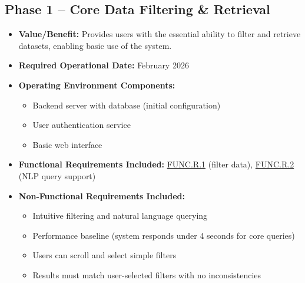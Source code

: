 \documentclass[12pt]{article}
\begin{document}
\subsection*{Phase 1 -- Core Data Filtering \& Retrieval}
\begin{itemize}
    \item \textbf{Value/Benefit:} Provides users with the essential ability to filter and retrieve datasets, enabling basic use of the system.
    \item \textbf{Required Operational Date:} February 2026
    \item \textbf{Operating Environment Components:}
    \begin{itemize}
        \item Backend server with database (initial configuration)
        \item User authentication service
        \item Basic web interface
    \end{itemize}
    \item \textbf{Functional Requirements Included:} \hyperref[req:func.r.1]{FUNC.R.1} (filter data), \hyperref[req:func.r.2]{FUNC.R.2} (NLP query support)
    \item \textbf{Non-Functional Requirements Included:} 
    \begin{itemize}
        \item Intuitive filtering and natural language querying
        \item Performance baseline (system responds under 4 seconds for core queries)
        \item Users can scroll and select simple filters
        \item Results must match user-selected filters with no inconsistencies
    \end{itemize}
\end{itemize}
\end{document}
